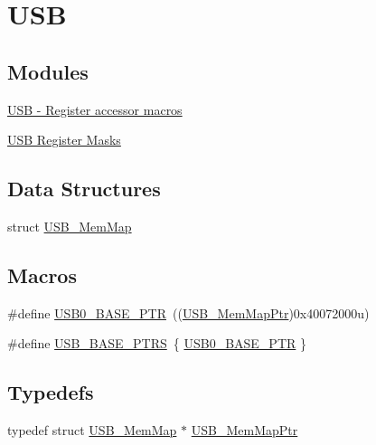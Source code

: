 \hypertarget{group___u_s_b___peripheral}{}\section{U\+S\+B}
\label{group___u_s_b___peripheral}
\subsection*{Modules}
\begin{DoxyCompactItemize}
\item 
\hyperlink{group___u_s_b___register___accessor___macros}{U\+S\+B -\/ Register accessor macros}
\item 
\hyperlink{group___u_s_b___register___masks}{U\+S\+B Register Masks}
\end{DoxyCompactItemize}
\subsection*{Data Structures}
\begin{DoxyCompactItemize}
\item 
struct \hyperlink{struct_u_s_b___mem_map}{U\+S\+B\+\_\+\+Mem\+Map}
\end{DoxyCompactItemize}
\subsection*{Macros}
\begin{DoxyCompactItemize}
\item 
\#define \hyperlink{group___u_s_b___peripheral_ga598ff5eb20a0551af232710b3f27640a}{U\+S\+B0\+\_\+\+B\+A\+S\+E\+\_\+\+P\+T\+R}~((\hyperlink{group___u_s_b___peripheral_gaabd989a49827dc34abb5de32732f4125}{U\+S\+B\+\_\+\+Mem\+Map\+Ptr})0x40072000u)
\item 
\#define \hyperlink{group___u_s_b___peripheral_gabb481a231c7c57907377d7ee985f826c}{U\+S\+B\+\_\+\+B\+A\+S\+E\+\_\+\+P\+T\+R\+S}~\{ \hyperlink{group___u_s_b___peripheral_ga598ff5eb20a0551af232710b3f27640a}{U\+S\+B0\+\_\+\+B\+A\+S\+E\+\_\+\+P\+T\+R} \}
\end{DoxyCompactItemize}
\subsection*{Typedefs}
\begin{DoxyCompactItemize}
\item 
typedef struct \hyperlink{struct_u_s_b___mem_map}{U\+S\+B\+\_\+\+Mem\+Map} $\ast$ \hyperlink{group___u_s_b___peripheral_gaabd989a49827dc34abb5de32732f4125}{U\+S\+B\+\_\+\+Mem\+Map\+Ptr}
\end{DoxyCompactItemize}


